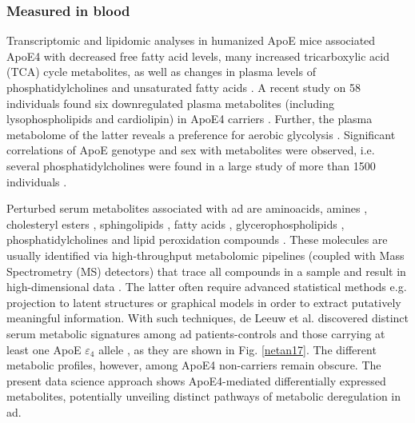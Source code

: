 \documentclass{amsart}
\begin{document}
\subsubsection*{Measured in blood}
Transcriptomic and lipidomic analyses in humanized ApoE mice associated ApoE4 with decreased free fatty acid levels, many increased  tricarboxylic acid (TCA) cycle metabolites, as well as changes in plasma levels of phosphatidylcholines and unsaturated fatty acids \cite{Area-Gomez2020APOE4Mice, Zhao2020AlzheimersPathways}. A recent study on 58 individuals found six downregulated plasma metabolites (including lysophospholipids and cardiolipin) in ApoE4 carriers \cite{pena-bautista2020MetabolomicsEffect}. Further, the plasma metabolome of the latter reveals a preference for aerobic glycolysis \cite{Farmer2021APO4Glycolysis}. Significant correlations of ApoE genotype and sex with metabolites were observed, i.e. several phosphatidylcholines were found in a large study of more than 1500 individuals \cite{Arnold2020SexMetabolome}.

Perturbed serum metabolites associated with \acrshort{ad} are aminoacids, amines \cite{deLeeuw2017Blood-basedDisease, Green2023InvestigatingDisease}, cholesteryl esters \cite{Proitsi2017AssociationAnalysis}, sphingolipids \cite{Varma2018BrainStudy,Sun2022AssociationDisease,Green2023InvestigatingDisease,Oeckl2019GlialImpairment,Barupal2019SetsPathophysiology}, fatty acids \cite{Fernandez-Calle2022APOEDiseases,deLeeuw2017Blood-basedDisease}, glycerophospholipids \cite{Varma2018BrainStudy, Jia2022ATypes,Huo2020BrainAnalysis, Weng2019TheImpairment}, phosphatidylcholines \cite{Simpson2016BloodAging} and lipid peroxidation compounds \cite{Fernandez-Calle2022APOEDiseases}. These molecules are usually identified via high-throughput metabolomic pipelines (coupled with Mass Spectrometry (MS) detectors) that trace all compounds in a sample and result in high-dimensional data \cite{Oka2023MultiomicsCohort}. The latter often require advanced statistical methods e.g. projection to latent structures \cite{Weng2019TheImpairment, Peeters2019StableData} or graphical models \cite{Peeters2022Rags2ridges:Matrices} in order to extract putatively meaningful information. 
With such techniques, de Leeuw et al. discovered distinct serum metabolic signatures among \acrshort{ad} patients-controls and those carrying at least one ApoE $\varepsilon_4$ allele \cite{deLeeuw2017Blood-basedDisease}, as they are shown in Fig. \ref{netan17}. The different metabolic profiles, however, among ApoE4 non-carriers remain obscure. The present data science approach shows ApoE4-mediated differentially expressed metabolites, potentially unveiling distinct pathways of metabolic deregulation in \acrshort{ad}.
\end{document}

